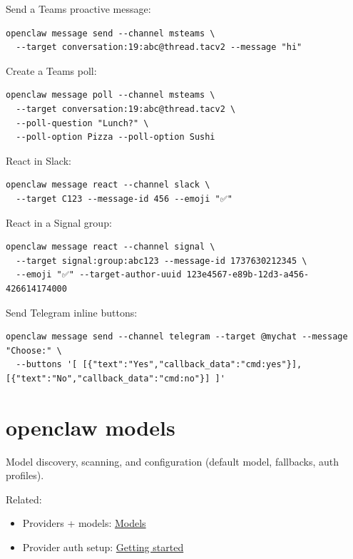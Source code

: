 Send a Teams proactive message:

\begin{lstlisting}
openclaw message send --channel msteams \
  --target conversation:19:abc@thread.tacv2 --message "hi"
\end{lstlisting}


Create a Teams poll:

\begin{lstlisting}
openclaw message poll --channel msteams \
  --target conversation:19:abc@thread.tacv2 \
  --poll-question "Lunch?" \
  --poll-option Pizza --poll-option Sushi
\end{lstlisting}


React in Slack:

\begin{lstlisting}
openclaw message react --channel slack \
  --target C123 --message-id 456 --emoji "✅"
\end{lstlisting}


React in a Signal group:

\begin{lstlisting}
openclaw message react --channel signal \
  --target signal:group:abc123 --message-id 1737630212345 \
  --emoji "✅" --target-author-uuid 123e4567-e89b-12d3-a456-426614174000
\end{lstlisting}


Send Telegram inline buttons:

\begin{lstlisting}
openclaw message send --channel telegram --target @mychat --message "Choose:" \
  --buttons '[ [{"text":"Yes","callback_data":"cmd:yes"}], [{"text":"No","callback_data":"cmd:no"}] ]'
\end{lstlisting}



\clearpage

\section{openclaw models}


Model discovery, scanning, and configuration (default model, fallbacks, auth profiles).

Related:

\begin{itemize}
  \item Providers + models: \href{/providers/models}{Models}
  \item Provider auth setup: \href{/start/getting-started}{Getting started}
\end{itemize}


